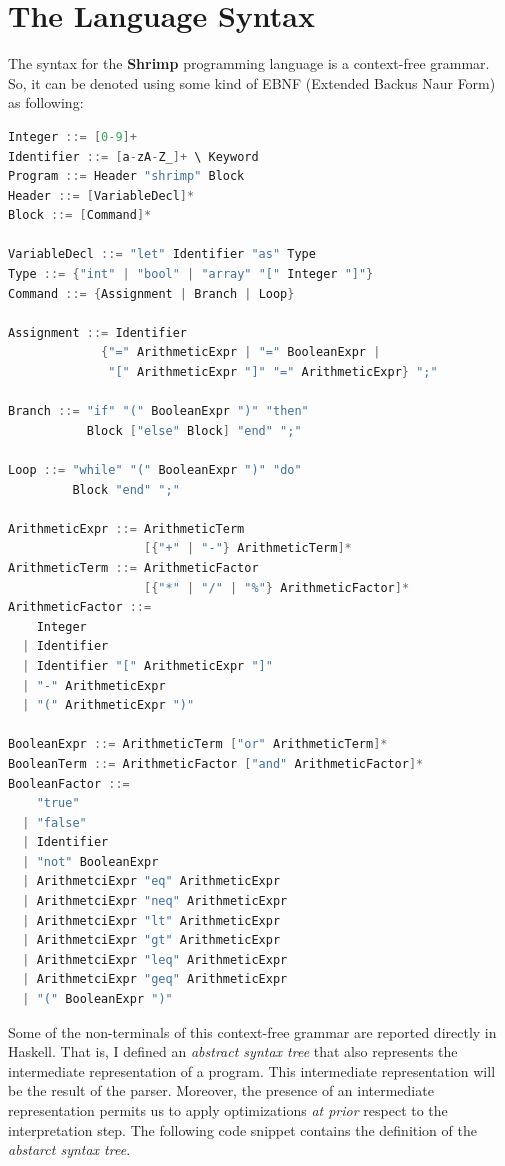\documentclass[12pt,a4paper]{article}
\begin{document}
\section*{The Language Syntax}
The syntax for the \textbf{Shrimp} programming language is a context-free grammar.
So, it can be denoted using some kind of EBNF (Extended Backus Naur Form) as following:
\begin{lstlisting}[language=C, style=custom-style]
Integer ::= [0-9]+
Identifier ::= [a-zA-Z_]+ \ Keyword
Program ::= Header "shrimp" Block
Header ::= [VariableDecl]*
Block ::= [Command]*

VariableDecl ::= "let" Identifier "as" Type
Type ::= {"int" | "bool" | "array" "[" Integer "]"}
Command ::= {Assignment | Branch | Loop}

Assignment ::= Identifier
             {"=" ArithmeticExpr | "=" BooleanExpr |
              "[" ArithmeticExpr "]" "=" ArithmeticExpr} ";"

Branch ::= "if" "(" BooleanExpr ")" "then"
           Block ["else" Block] "end" ";"

Loop ::= "while" "(" BooleanExpr ")" "do"
         Block "end" ";"

ArithmeticExpr ::= ArithmeticTerm
                   [{"+" | "-"} ArithmeticTerm]*
ArithmeticTerm ::= ArithmeticFactor
                   [{"*" | "/" | "%"} ArithmeticFactor]*
ArithmeticFactor ::=
    Integer
  | Identifier
  | Identifier "[" ArithmeticExpr "]"
  | "-" ArithmeticExpr
  | "(" ArithmeticExpr ")"

BooleanExpr ::= ArithmeticTerm ["or" ArithmeticTerm]*
BooleanTerm ::= ArithmeticFactor ["and" ArithmeticFactor]*
BooleanFactor ::=
    "true"
  | "false"
  | Identifier
  | "not" BooleanExpr
  | ArithmetciExpr "eq" ArithmeticExpr
  | ArithmetciExpr "neq" ArithmeticExpr
  | ArithmetciExpr "lt" ArithmeticExpr
  | ArithmetciExpr "gt" ArithmeticExpr
  | ArithmetciExpr "leq" ArithmeticExpr
  | ArithmetciExpr "geq" ArithmeticExpr
  | "(" BooleanExpr ")"
\end{lstlisting}
Some of the non-terminals of this context-free grammar are reported directly in Haskell.
That is, I defined an \textit{abstract syntax tree} that also represents the intermediate representation of a program.
This intermediate representation will be the result of the parser.
Moreover, the presence of an intermediate representation permits us to apply optimizations \textit{at prior} respect to the interpretation step.
The following code snippet contains the definition of the \textit{abstarct syntax tree}.
\end{document}
